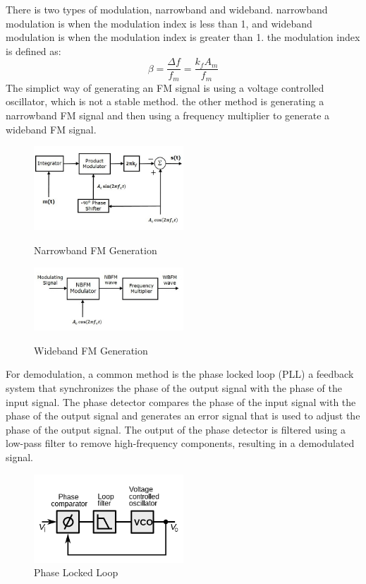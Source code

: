 \documentclass[12pt]{article}
\begin{document}
There is two types of modulation, narrowband and wideband. narrowband modulation is when the modulation index is less than 1, and wideband modulation is when the modulation index is greater than 1. the modulation index is defined as:
\begin{equation}
    \beta = \frac{\Delta f}{f_m} = \frac{k_f A_m}{f_m}
\end{equation}
The simplict way of generating an FM signal is using a voltage controlled oscillator, which is not a stable method. the other method is generating a narrowband FM signal and then using a frequency multiplier to generate a wideband FM signal.

\begin{figure}[H]
    \centering
    \includegraphics[width=0.5\textwidth]{assets/img/nbfm_modulator.jpg}
    \caption{Narrowband FM Generation}
    \cite{tutorialspoint}
\end{figure}
\begin{figure}[H]
    \centering
    \includegraphics[width=0.5\textwidth]{assets/img/indirect_method.jpg}
    \caption{Wideband FM Generation}
    \cite{tutorialspoint}
\end{figure}
For demodulation, a common method is the phase locked loop (PLL) a feedback system that synchronizes the phase of the output signal with the phase of the input signal. The phase detector compares the phase of the input signal with the phase of the output signal and generates an error signal that is used to adjust the phase of the output signal. The output of the phase detector is filtered using a low-pass filter to remove high-frequency components, resulting in a demodulated signal.
\begin{figure}[H]
    \centering
    \includegraphics[width=0.5\textwidth]{assets/img/PLL.png}
    \caption{Phase Locked Loop}
\end{figure}
\end{document}
